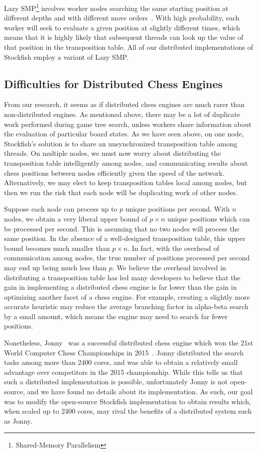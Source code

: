 \documentclass{article}
\begin{document}
Lazy SMP\footnote{Shared-Memory Parallelism} involves worker nodes searching the
same starting position at different depths and with different move
orders~\cite{LazySMP}.
With high probability, each worker will seek to evaluate a given position at
slightly different times, which means that it is highly likely that subsequent
threads can look up the value of that position in the transposition table. All
of our distributed implementations of Stockfish employ a variant of Lazy SMP.

\subsection{Difficulties for Distributed Chess Engines}
From our research, it seems as if distributed chess engines are much rarer than
non-distributed engines. 
As mentioned above, there may be a lot of duplicate work performed during
game tree search, unless workers share information about the evaluation of
particular board states. As we have seen above, on one node, Stockfish's
solution is to share an unsynchronized transposition table among threads. On
multiple nodes, we must now worry about distributing the transposition table
intelligently among nodes, and communicating results about chess positions between
nodes efficiently given the speed of the network. Alternatively, we may elect
to keep transposition tables local among nodes, but then we run the risk that
each node will be duplicating work of other nodes.

Suppose each node can process up to $p$ unique positions per second. With $n$ nodes, we
obtain a very liberal upper bound of $p\times n$ unique positions which can be processed per
second. This is assuming that no two nodes will process the same position. In
the absence of a well-designed transposition table, this upper bound becomes
much smaller than $p \times n$. In fact, with the overhead of communication
among nodes, the true number of positions processed per second may end up being
much less than $p$. We believe the overhead involved in distributing a
transposition table has led many developers to believe that the gain in
implementing a distributed chess engine is far lower than the gain in
optimizing another facet of a chess engine. For example, creating a slightly
more accurate heuristic may reduce the average branching factor in alpha-beta
search by a small amount, which means the engine may need to search far fewer
positions.

Nonetheless, Jonny~\cite{wiki:Jonny} was a successful distributed chess engine
which won the 21st World Computer Chess Championships in 2015~\cite{WCCC15}.
Jonny distributed the search tasks among more than 2400 cores, and was able to
obtain a relatively small advantage over competitors in the 2015 championship.
While this tells us that such a distributed implementation is possible,
unfortunately Jonny is not open-source, and we have found no details about its
implementation. As such, our goal was to modify the open-source Stockfish
implementation to obtain results which, when scaled up to 2400 cores, may rival
the benefits of a distributed system such as Jonny.
\end{document}
